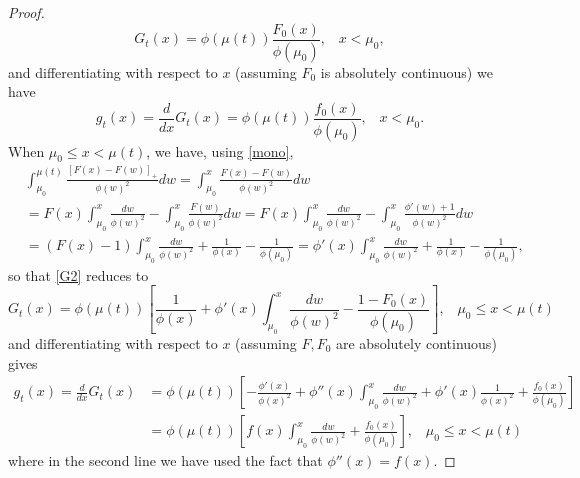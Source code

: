 \documentclass{article}
\numberwithin{equation}{section}
\begin{document}
\begin{proof}
	\begin{equation}\label{part1}G_t(x)=\phi(\mu(t))\frac{F_0(x)}{\phi(\mu_0)},\;\;\;x<\mu_0,
	\end{equation}
	and differentiating with respect to $x$ (assuming $F_0$ is absolutely continuous) we have
	\begin{equation}\label{part1d}g_t(x)=\frac{d}{dx}G_t(x)=\phi(\mu(t))\frac{f_0(x)}{\phi(\mu_0)},\;\;\;x<\mu_0.
	\end{equation}
	When
	$\mu_0\leq x<\mu(t)$, we have, using \eqref{mono}, 
	\begin{align}\label{kc}&\int_{\mu_0}^{\mu(t)} \frac{[F(x)-F(w)]_+}{\phi(w)^2}  dw=\int_{\mu_0}^{x} \frac{F(x)-F(w)}{\phi(w)^2} dw\\
		&=F(x)\int_{\mu_0}^{x}\frac{dw}{\phi(w)^2} -\int_{\mu_0}^{x} \frac{F(w)}{\phi(w)^2} dw=F(x)\int_{\mu_0}^{x}\frac{dw}{\phi(w)^2} -\int_{\mu_0}^{x} \frac{\phi'(w)+1}{\phi(w)^2} dw\nonumber\\
		&=(F(x)-1)\int_{\mu_0}^{x}\frac{dw}{\phi(w)^2} +\frac{1}{\phi(x)}-\frac{1}{\phi(\mu_0)}=\phi'(x)\int_{\mu_0}^{x}\frac{dw}{\phi(w)^2} +\frac{1}{\phi(x)}-\frac{1}{\phi(\mu_0)},\nonumber\end{align}
	so that \eqref{G2} reduces to
	\begin{equation}\label{part2}G_t(x)=\phi(\mu(t))\left[\frac{1}{\phi(x)}+\phi'(x)\int_{\mu_0}^{x}\frac{dw}{\phi(w)^2}-\frac{1-F_0(x)}{\phi(\mu_0)} \right],\;\;\;\mu_0\leq x<\mu(t)
	\end{equation}
	and differentiating with respect to $x$ (assuming $F,F_0$ are absolutely continuous) gives
	\begin{align}\label{part2d}g_t(x)=\frac{d}{dx}G_t(x)&=\phi(\mu(t))\left[-\frac{\phi'(x)}{\phi(x)^2}+\phi''(x)\int_{\mu_0}^{x}\frac{dw}{\phi(w)^2}
		+\phi'(x)\frac{1}{\phi(x)^2}
		+\frac{f_0(x)}{\phi(\mu_0)} \right]\\
		&=\phi(\mu(t))\left[f(x)\int_{\mu_0}^{x}\frac{dw}{\phi(w)^2}
		+\frac{f_0(x)}{\phi(\mu_0)} \right],\;\;\;\mu_0\leq x<\mu(t)\nonumber
	\end{align}
	where in the second line we have used the fact that $\phi''(x)=f(x)$.
	

\end{proof}
\end{document}

